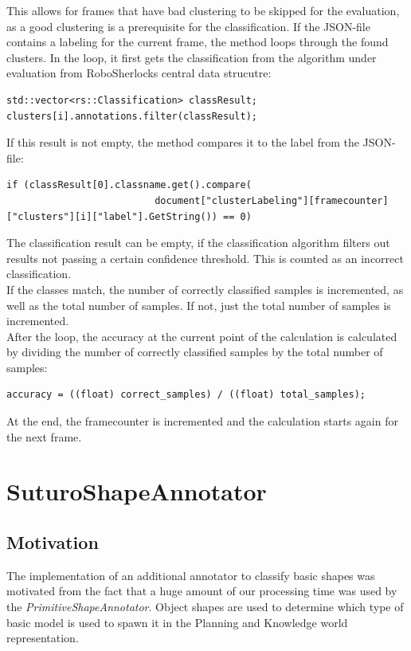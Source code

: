 \documentclass[main.tex]{subfiles}
\begin{document}
This allows for frames that have bad clustering to be skipped for the evaluation, as a good clustering is a prerequisite for the classification. If the JSON-file contains a labeling for the current frame, the method loops through the found clusters. In the loop, it first gets the classification from the algorithm under evaluation from RoboSherlocks central data strucutre:

\begin{lstlisting}
std::vector<rs::Classification> classResult;
clusters[i].annotations.filter(classResult);
\end{lstlisting}

If this result is not empty, the method compares it to the label from the JSON-file:

\begin{lstlisting}
if (classResult[0].classname.get().compare(
                          document["clusterLabeling"][framecounter]["clusters"][i]["label"].GetString()) == 0)
\end{lstlisting}

The classification result can be empty, if the classification algorithm filters out results not passing a certain confidence threshold. This is counted as an incorrect classification.\\

If the classes match, the number of correctly classified samples is incremented, as well as the total number of samples. If not, just the total number of samples is incremented.\\

After the loop, the accuracy at the current point of the calculation is calculated by dividing the number of correctly classified samples by the total number of samples:

\begin{lstlisting}
accuracy = ((float) correct_samples) / ((float) total_samples);
\end{lstlisting}

At the end, the framecounter is incremented and the calculation starts again for the next frame.

\section{SuturoShapeAnnotator}

\subsection{Motivation}
The implementation of an additional annotator to classify basic shapes was motivated from the fact that a huge amount of our processing time
was used by the \textit{PrimitiveShapeAnnotator}. Object shapes are used to determine which type of basic model is used to spawn it in the Planning and Knowledge world representation.
\end{document}
